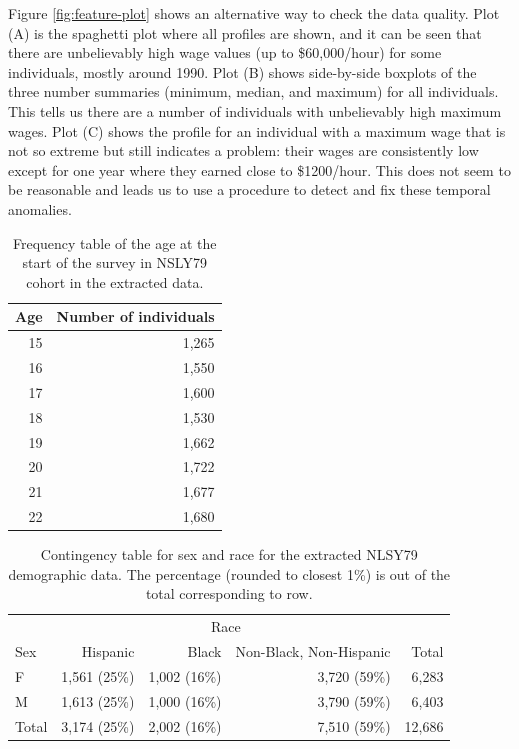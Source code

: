 \documentclass[12pt]{article}
\begin{document}
Figure \ref{fig:feature-plot} shows an alternative way to check the data quality. Plot (A) is the spaghetti plot where all profiles are shown, and it can be seen that there are unbelievably high wage values (up to \$60,000/hour) for some individuals, mostly around 1990. Plot (B) shows side-by-side boxplots of the three number summaries (minimum, median, and maximum) for all individuals. This tells us there are a number of individuals with unbelievably high maximum wages. Plot (C) shows the profile for an individual with a maximum wage that is not so extreme but still indicates a problem: their wages are consistently low except for one year where they earned close to \$1200/hour. This does not seem to be reasonable and leads us to use a procedure to detect and fix these temporal anomalies.

\begin{table}

\caption{\label{tab:age-table}Frequency table of the age at the start of the survey in NSLY79 cohort in the extracted data.}
\centering
\begin{tabular}[t]{rr}
\toprule
Age & Number of individuals\\
\midrule
15 & 1,265\\
16 & 1,550\\
17 & 1,600\\
18 & 1,530\\
19 & 1,662\\
20 & 1,722\\
21 & 1,677\\
22 & 1,680\\
\bottomrule
\end{tabular}
\end{table}

\begin{table}

\caption{\label{tab:gender-race-table}Contingency table for sex and race for the extracted NLSY79 demographic data. The percentage (rounded to closest 1\%) is out of the total corresponding to row.}
\centering
\begin{tabular}[t]{lrrrr}
\toprule
\multicolumn{1}{c}{ } & \multicolumn{3}{c}{Race} & \multicolumn{1}{c}{ } \\
\cmidrule(l{3pt}r{3pt}){2-4}
Sex & Hispanic & Black & Non-Black, Non-Hispanic & Total\\
\midrule
F & 1,561 (25\%) & 1,002 (16\%) & 3,720 (59\%) & 6,283\\
M & 1,613 (25\%) & 1,000 (16\%) & 3,790 (59\%) & 6,403\\
\midrule
Total & 3,174 (25\%) & 2,002 (16\%) & 7,510 (59\%) & 12,686\\
\bottomrule
\end{tabular}
\end{table}
\end{document}
